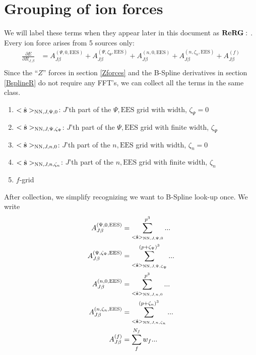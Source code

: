 \documentclass[paper=a4, fontsize=11pt]{article} %
\numberwithin{equation}{section} %
\numberwithin{figure}{section} %
\numberwithin{table}{section} %
\newcommand{\p}{\partial}
\newcommand{\hs}{{\hat{\bf{s}}}}
\newcommand{\rEES}{{\mathrm{EES}}}
\newcommand{\rNN}{{\mathrm{NN}}}
\newcommand{\RJb}{{R_{J,\beta}}}
\newcommand{\pzp}{{(p+\zeta_{\Psi})^3}}
\newcommand{\pzn}{{(p+\zeta_n)^3}}
\newcommand{\hsJp}{{<\hs>_{\rNN,J,\Psi,\zeta_\Psi}}}
\newcommand{\hsJn}{{<\hs>_{\rNN,J,n,\zeta_n}}}
\newcommand{\hsJpzr}{{<\hs>_{\rNN,J,\Psi,0}}}
\newcommand{\hsJnzr}{{<\hs>_{\rNN,J,n,0}}}
\newcommand{\ReRG}{{{\bf ReRG:\ }}}
\begin{document}
\newpage
\section{Grouping of ion forces}\label{App:F}
We will label these terms when they appear later in this document as $\ReRG$.\\

Every ion force arises from 5 sources only:
\begin{equation}\label{eq:groupdEdRgen}
\begin{split}
\frac{\p E}{\p \RJb} &= A_{J\beta}^{(\Psi,0,\rEES)}+ A_{J\beta}^{(\Psi,\zeta_\Psi,\rEES)}+ A_{J\beta}^{(n,0,\rEES)}+ A_{J\beta}^{(n,\zeta_n,\rEES)}+ A_{J\beta}^{(f)}\\
\end{split}
\end{equation}
Since the ``$Z$'' forces in section \ref{Zforces} and the B-Spline derivatives in section \ref{BsplineR} do not require any FFT's, we can collect all the terms in the same class. \\
\begin{enumerate}
\item $\hsJpzr$: $J$'th part of the $\Psi,\rEES$ grid with width, $\zeta_{\Psi} = 0$
\item $\hsJp$: $J$'th part of the $\Psi,\rEES$ grid with finite width, $\zeta_{\Psi}$
\item $\hsJnzr$: $J$'th part of the $n,\rEES$ grid with width, $\zeta_n = 0$
\item $\hsJn$: $J$'th part of the $n,\rEES$ grid with finite width, $\zeta_n$
\item $f$-grid 
\end{enumerate}

After collection, we simplify recognizing we want to B-Spline look-up once. We write 
\begin{equation}
\begin{split}
A_{J\beta}^{(\Psi,0,\rEES)} &= \sum_{\hsJpzr}^{p^3} ... \\
A_{J\beta}^{(\Psi,\zeta_\Psi,\rEES)} &= \sum_{\hsJp}^{\pzp} ... \\
A_{J\beta}^{(n,0,\rEES)} &= \sum_{\hsJnzr}^{p^3} ... \\
A_{J\beta}^{(n,\zeta_n,\rEES)} &= \sum_{\hsJn}^{\pzn} ... \\
A_{J\beta}^{(f)} &= \sum_{f}^{N_f} w_f ... \\
\end{split}
\end{equation}
\end{document}
